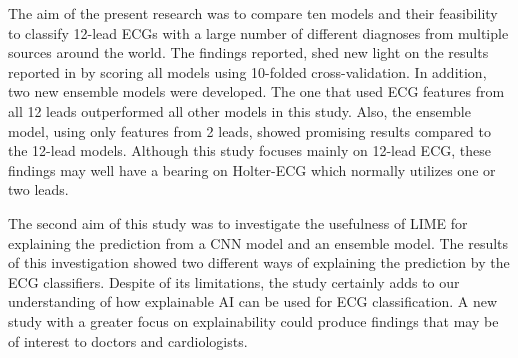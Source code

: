 The aim of the present research was to compare ten models and their feasibility to classify 12-lead ECGs with a large number of different diagnoses from multiple sources around the world. The findings reported, shed new light on the results reported in \cite{singstad_convolutional_nodate} by scoring all models using 10-folded cross-validation. In addition, two new ensemble models were developed. The one that used ECG features from all 12 leads outperformed all other models in this study. Also, the ensemble model, using only features from 2 leads, showed promising results compared to the 12-lead models. Although this study focuses mainly on 12-lead ECG, these findings may well have a bearing on Holter-ECG which normally utilizes one or two leads.

The second aim of this study was to investigate the usefulness of LIME for explaining the prediction from a CNN model and an ensemble model. The results of this investigation showed two different ways of explaining the prediction by the ECG classifiers. Despite of its limitations, the study certainly adds to our understanding of how explainable AI can be used for ECG classification. A new study with a greater focus on explainability could produce findings that may be of interest to doctors and cardiologists.